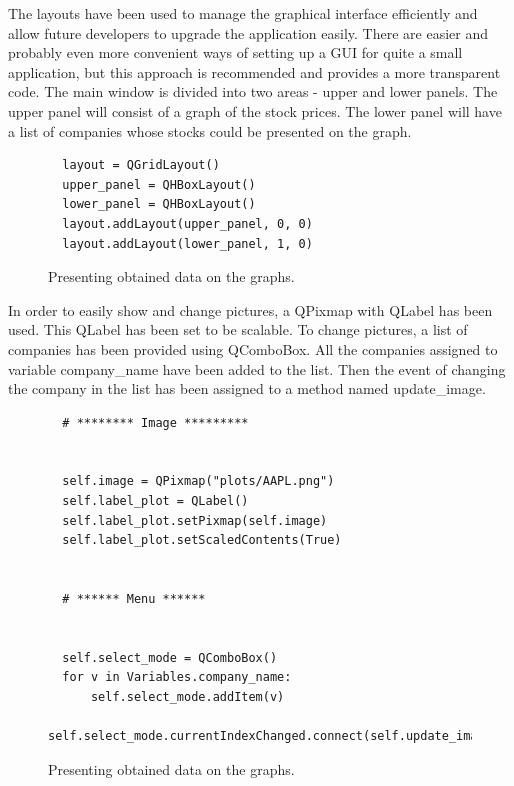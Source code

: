 The layouts have been used to manage the graphical interface efficiently and allow future developers to upgrade the application easily. There are easier and probably even more convenient ways of setting up a GUI for quite a small application, but this approach is recommended and provides a more transparent code. The main window is divided into two areas -  upper and lower panels. The upper panel will consist of a graph of the stock prices. The lower panel will have a list of companies whose stocks could be presented on the graph.
\clearpage
\begin{figure}
\centering
\begin{lstlisting}
  layout = QGridLayout()
  upper_panel = QHBoxLayout()
  lower_panel = QHBoxLayout()
  layout.addLayout(upper_panel, 0, 0)
  layout.addLayout(lower_panel, 1, 0)
\end{lstlisting}
\caption{Presenting obtained data on the graphs.}
\label{fig:pseudocode:listings}
\end{figure}

In order to easily show and change pictures, a QPixmap with QLabel has been used.
This QLabel has been set to be scalable. To change pictures, a list of companies has been provided using QComboBox. All the companies assigned to variable company{\_}name have been added to the list. Then the event of changing the company in the list has been assigned to a method named update{\_}image.
\clearpage
\begin{figure}
\centering
\begin{lstlisting}
  # ******** Image *********


  self.image = QPixmap("plots/AAPL.png")
  self.label_plot = QLabel()
  self.label_plot.setPixmap(self.image)
  self.label_plot.setScaledContents(True)


  # ****** Menu ******


  self.select_mode = QComboBox()
  for v in Variables.company_name:
      self.select_mode.addItem(v)
  self.select_mode.currentIndexChanged.connect(self.update_image)

\end{lstlisting}
\caption{Presenting obtained data on the graphs.}
\label{fig:pseudocode:listings}
\end{figure}


